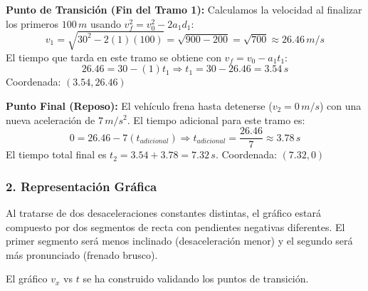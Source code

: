 \documentclass[12pt, a4paper]{article}
\begin{document}
\textbf{Punto de Transición (Fin del Tramo 1):}
Calculamos la velocidad al finalizar los primeros $100 \, \si{m}$ usando $v_f^2 = v_0^2 - 2a_1 d_1$:
$$ v_1 = \sqrt{30^2 - 2(1)(100)} = \sqrt{900 - 200} = \sqrt{700} \approx 26.46 \, \si{m/s} $$
El tiempo que tarda en este tramo se obtiene con $v_f = v_0 - a_1 t_1$:
$$ 26.46 = 30 - (1)t_1 \Rightarrow t_1 = 30 - 26.46 = 3.54 \, \si{s} $$
Coordenada: $(3.54, 26.46)$

\textbf{Punto Final (Reposo):}
El vehículo frena hasta detenerse ($v_2 = 0 \, \si{m/s}$) con una nueva aceleración de $7 \, \si{m/s^2}$. El tiempo adicional para este tramo es:
$$ 0 = 26.46 - 7(t_{adicional}) \Rightarrow t_{adicional} = \frac{26.46}{7} \approx 3.78 \, \si{s} $$
El tiempo total final es $t_2 = 3.54 + 3.78 = 7.32 \, \si{s}$.
Coordenada: $(7.32, 0)$

\subsubsection*{2. Representación Gráfica}
Al tratarse de dos desaceleraciones constantes distintas, el gráfico estará compuesto por dos segmentos de recta con pendientes negativas diferentes. El primer segmento será menos inclinado (desaceleración menor) y el segundo será más pronunciado (frenado brusco).

\begin{center}
\end{center}

\begin{tcolorbox}[colback=green!5!white, colframe=green!50!black, title=Respuesta Final]
\centering El gráfico $v_x$ vs $t$ se ha construido validando los puntos de transición.
\end{tcolorbox}
\end{document}
